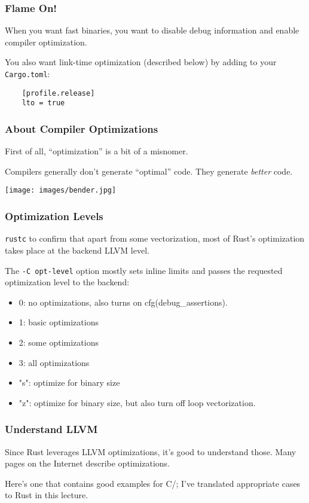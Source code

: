 \begin{frame}[fragile]
\frametitle{Flame On!}

When you want fast binaries, you want to disable debug information and enable compiler optimization.

 You also want link-time optimization (described below) by adding to your \texttt{Cargo.toml}:
\begin{verbatim}
    [profile.release]
    lto = true
\end{verbatim}
\end{frame}


\begin{frame}
\frametitle{About Compiler Optimizations}

First of all, ``optimization'' is
a bit of a misnomer. 

Compilers generally don't generate ``optimal'' code. They generate \emph{better} code.

\begin{center}
\texttt{[image: images/bender.jpg]}
\end{center}


\end{frame}


\begin{frame}
\frametitle{Optimization Levels}

\texttt{rustc} to confirm that apart from some vectorization, most of Rust's optimization takes place at the backend LLVM level.


The \texttt{-C opt-level} option mostly sets inline limits and passes the requested optimization level to the backend:

\begin{itemize}
\item    0: no optimizations, also turns on cfg(debug\_assertions).
\item    1: basic optimizations
\item    2: some optimizations
\item     3: all optimizations
\item    "s": optimize for binary size
\item    "z": optimize for binary size, but also turn off loop vectorization.
\end{itemize}

\end{frame}


\begin{frame}
\frametitle{Understand LLVM}
 Since Rust leverages LLVM optimizations, it's good to understand those. Many pages on the Internet describe
optimizations. 

Here's one that contains good examples for C/\CPP; I've translated appropriate cases to Rust in this lecture.

\end{frame}


